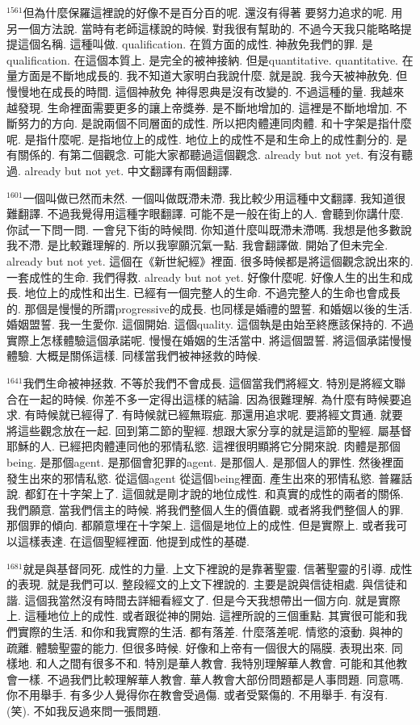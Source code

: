 \documentclass{book}
\begin{document}
$^{1561}$但為什麼保羅這裡說的好像不是百分百的呢.
還沒有得著 要努力追求的呢.
用另一個方法說.
當時有老師這樣說的時候.
對我很有幫助的.
不過今天我只能略略提提這個名稱.
這種叫做.
qualification.
在質方面的成性.
神赦免我們的罪.
是qualification.
在這個本質上.
是完全的被神接納.
但是quantitative.
quantitative.
在量方面是不斷地成長的.
我不知道大家明白我說什麼.
就是說.
我今天被神赦免.
但慢慢地在成長的時間.
這個神赦免 神得恩典是沒有改變的.
不過這種的量.
我越來越發現.
生命裡面需要更多的讓上帝獎券.
是不斷地增加的.
這裡是不斷地增加.
不斷努力的方向.
是說兩個不同層面的成性.
所以把肉體連同肉體.
和十字架是指什麼呢.
是指什麼呢.
是指地位上的成性.
地位上的成性不是和生命上的成性劃分的.
是有關係的.
有第二個觀念.
可能大家都聽過這個觀念.
already but not yet.
有沒有聽過.
already but not yet.
中文翻譯有兩個翻譯.

$^{1601}$一個叫做已然而未然.
一個叫做既滯未滯.
我比較少用這種中文翻譯.
我知道很難翻譯.
不過我覺得用這種字眼翻譯.
可能不是一般在街上的人.
會聽到你講什麼.
你試一下問一問.
一會兒下街的時候問.
你知道什麼叫既滯未滯嗎.
我想是他多數說我不滯.
是比較難理解的.
所以我寧願沉氣一點.
我會翻譯做.
開始了但未完全.
already but not yet.
這個在《新世紀經》裡面.
很多時候都是將這個觀念說出來的.
一套成性的生命.
我們得救.
already but not yet.
好像什麼呢.
好像人生的出生和成長.
地位上的成性和出生.
已經有一個完整人的生命.
不過完整人的生命也會成長的.
那個是慢慢的所謂progressive的成長.
也同樣是婚禮的盟誓.
和婚姻以後的生活.
婚姻盟誓.
我一生愛你.
這個開始.
這個quality.
這個執是由始至終應該保持的.
不過實際上怎樣體驗這個承諾呢.
慢慢在婚姻的生活當中.
將這個盟誓.
將這個承諾慢慢體驗.
大概是關係這樣.
同樣當我們被神拯救的時候.

$^{1641}$我們生命被神拯救.
不等於我們不會成長.
這個當我們將經文.
特別是將經文聯合在一起的時候.
你差不多一定得出這樣的結論.
因為很難理解.
為什麼有時候要追求.
有時候就已經得了.
有時候就已經無瑕疵.
那還用追求呢.
要將經文貫通.
就要將這些觀念放在一起.
回到第二節的聖經.
想跟大家分享的就是這節的聖經.
屬基督耶穌的人.
已經把肉體連同他的邪情私慾.
這裡很明顯將它分開來說.
肉體是那個being.
是那個agent.
是那個會犯罪的agent.
是那個人.
是那個人的罪性.
然後裡面發生出來的邪情私慾.
從這個agent 從這個being裡面.
產生出來的邪情私慾.
普羅話說.
都釘在十字架上了.
這個就是剛才說的地位成性.
和真實的成性的兩者的關係.
我們願意.
當我們信主的時候.
將我們整個人生的價值觀.
或者將我們整個人的罪.
那個罪的傾向.
都願意埋在十字架上.
這個是地位上的成性.
但是實際上.
或者我可以這樣表達.
在這個聖經裡面.
他提到成性的基礎.

$^{1681}$就是與基督同死.
成性的力量.
上文下裡說的是靠著聖靈.
信著聖靈的引導.
成性的表現.
就是我們可以.
整段經文的上文下裡說的.
主要是說與信徒相處.
與信徒和諧.
這個我當然沒有時間去詳細看經文了.
但是今天我想帶出一個方向.
就是實際上.
這種地位上的成性.
或者跟從神的開始.
這裡所說的三個重點.
其實很可能和我們實際的生活.
和你和我實際的生活.
都有落差.
什麼落差呢.
情慾的滾動.
與神的疏離.
體驗聖靈的能力.
但很多時候.
好像和上帝有一個很大的隔膜.
表現出來.
同樣地.
和人之間有很多不和.
特別是華人教會.
我特別理解華人教會.
可能和其他教會一樣.
不過我們比較理解華人教會.
華人教會大部份問題都是人事問題.
同意嗎.
你不用舉手.
有多少人覺得你在教會受過傷.
或者受緊傷的.
不用舉手.
有沒有.
(笑).
不如我反過來問一張問題.
\end{document}
